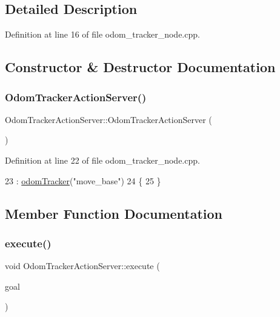 \subsection{Detailed Description}


Definition at line 16 of file odom\+\_\+tracker\+\_\+node.\+cpp.



\subsection{Constructor \& Destructor Documentation}
\mbox{\label{classOdomTrackerActionServer_a98b7fba6da04e1afcf1000f937be7fef}} 
\subsubsection{\texorpdfstring{Odom\+Tracker\+Action\+Server()}{OdomTrackerActionServer()}}
{\footnotesize\ttfamily Odom\+Tracker\+Action\+Server\+::\+Odom\+Tracker\+Action\+Server (\begin{DoxyParamCaption}{ }\end{DoxyParamCaption})\hspace{0.3cm}{\ttfamily [inline]}}



Definition at line 22 of file odom\+\_\+tracker\+\_\+node.\+cpp.


\begin{DoxyCode}
23       : \hyperlink{classOdomTrackerActionServer_a3e5c4328d3206fbd2fd2708f0aefe651}{odomTracker}(\textcolor{stringliteral}{"move\_base"})
24   \{
25   \}
\end{DoxyCode}


\subsection{Member Function Documentation}
\mbox{\label{classOdomTrackerActionServer_afa69287377bb2a12c5346cbe8d68cb04}} 
\subsubsection{\texorpdfstring{execute()}{execute()}}
{\footnotesize\ttfamily void Odom\+Tracker\+Action\+Server\+::execute (\begin{DoxyParamCaption}\item[{const Odom\+Tracker\+Goal\+Const\+Ptr \&}]{goal }\end{DoxyParamCaption})\hspace{0.3cm}{\ttfamily [inline]}}

